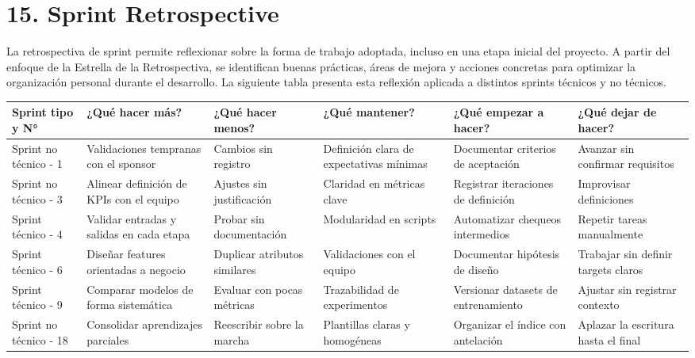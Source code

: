 \documentclass[
11pt, %
]{charter}
\begin{document}
\section{15. Sprint Retrospective}    
\label{sec:sprint_retro}

La retrospectiva de sprint permite reflexionar sobre la forma de trabajo adoptada, incluso en una etapa inicial del proyecto. A partir del enfoque de la Estrella de la Retrospectiva, se identifican buenas prácticas, áreas de mejora y acciones concretas para optimizar la organización personal durante el desarrollo. La siguiente tabla presenta esta reflexión aplicada a distintos sprints técnicos y no técnicos.

\begin{table}[htpb]
\renewcommand{\arraystretch}{1.4}
\begin{tabular}{|>{\raggedright\arraybackslash}p{1.8cm}|
                >{\raggedright\arraybackslash}p{2.3cm}|
                >{\raggedright\arraybackslash}p{2.3cm}|
                >{\raggedright\arraybackslash}p{2.3cm}|
                >{\raggedright\arraybackslash}p{2.3cm}|
                >{\raggedright\arraybackslash}p{2.3cm}|}
\hline
\rowcolor[HTML]{CCCCCC} 
\textbf{Sprint tipo y N°} & \textbf{¿Qué hacer más?} & \textbf{¿Qué hacer menos?} & \textbf{¿Qué mantener?} & \textbf{¿Qué empezar a hacer?} & \textbf{¿Qué dejar de hacer?} \\
\hline
Sprint no técnico - 1 & Validaciones tempranas con el sponsor & Cambios sin registro & Definición clara de expectativas mínimas & Documentar criterios de aceptación & Avanzar sin confirmar requisitos \\
\hline
Sprint no técnico - 3 & Alinear definición de KPIs con el equipo & Ajustes sin justificación & Claridad en métricas clave & Registrar iteraciones de definición & Improvisar definiciones \\
\hline
Sprint técnico - 4 & Validar entradas y salidas en cada etapa & Probar sin documentación & Modularidad en scripts & Automatizar chequeos intermedios & Repetir tareas manualmente \\
\hline
Sprint técnico - 6 & Diseñar features orientadas a negocio & Duplicar atributos similares & Validaciones con el equipo & Documentar hipótesis de diseño & Trabajar sin definir targets claros \\
\hline
Sprint técnico - 9 & Comparar modelos de forma sistemática & Evaluar con pocas métricas & Trazabilidad de experimentos & Versionar datasets de entrenamiento & Ajustar sin registrar contexto \\
\hline
Sprint no técnico - 18 & Consolidar aprendizajes parciales & Reescribir sobre la marcha & Plantillas claras y homogéneas & Organizar el índice con antelación & Aplazar la escritura hasta el final \\
\hline
\end{tabular}
\end{table}
\end{document}
